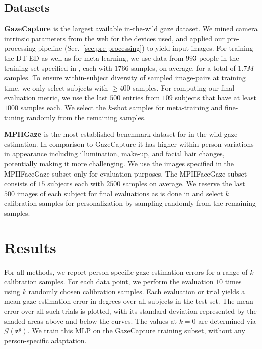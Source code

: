 \documentclass[10pt,twocolumn,letterpaper]{article}
\newcommand{\Paragraph}[1]
{\vspace{1.5mm} \noindent \textbf{#1}}
\begin{document}
\subsection{Datasets}

\Paragraph{GazeCapture \cite{Krafka2016CVPR}} is the largest available in-the-wild gaze dataset. We mined camera intrinsic parameters from the web for the devices used, and applied our pre-processing pipeline (Sec.~\ref{sec:pre-processing}) to yield input images.
For training the DT-ED as well as for meta-learning, we use data from $993$ people in the training set specified in \cite{Krafka2016CVPR}, each with $1766$ samples, on average, for a total of $1.7M$ samples. 
To ensure within-subject diversity of sampled image-pairs at training time, we only select subjects with $\geq 400$ samples.
For computing our final evaluation metric, we use the last $500$ entries from $109$ subjects that have at least $1000$ samples each. We select the $k$-shot samples for meta-training and fine-tuning randomly from the remaining samples.

\Paragraph{MPIIGaze \cite{Zhang2015CVPR}} is the most established benchmark dataset for in-the-wild gaze estimation. In comparison to GazeCapture it has higher within-person variations in appearance including illumination, make-up, and facial hair changes, potentially making it more challenging.
We use the images specified in the MPIIFaceGaze subset \cite{Zhang2017CVPRW} only for evaluation purposes. The MPIIFaceGaze subset consists of $15$ subjects each with $2500$ samples on average. We reserve the last $500$ images of each subject for final evaluations as is done in \cite{Zhang2019TPAMI} and select $k$ calibration samples for personalization by sampling randomly from the remaining samples. 
 
\section{Results}

For all methods, we report person-specific gaze estimation errors for a range of $k$ calibration samples.
For each data point, we perform the evaluation $10$ times using $k$ randomly chosen calibration samples. 
Each evaluation or trial yields a mean gaze estimation error in degrees over all subjects in the test set.
The mean error over all such trials is plotted, with its standard deviation represented by the shaded areas above and below the curves.
The values at $k = 0$ are determined via $\mathcal{G}\left(\mathbf{z}^g\right)$. 
We train this MLP on the GazeCapture training subset, without any person-specific adaptation.
\end{document}

